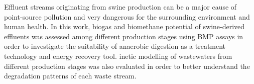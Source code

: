 Effluent streams originating from swine production can be a major cause of point-source pollution and very dangerous for the surrounding environment and human health. In this work, biogas and biomethane potential of swine-derived effluents was assessed among different production stages using BMP assays in order to investigate the suitability of anaerobic digestion as a treatment technology and energy recovery tool. inetic modelling of wastewaters from different production stages was also evaluated in order to better understand the degradation patterns of each waste stream.